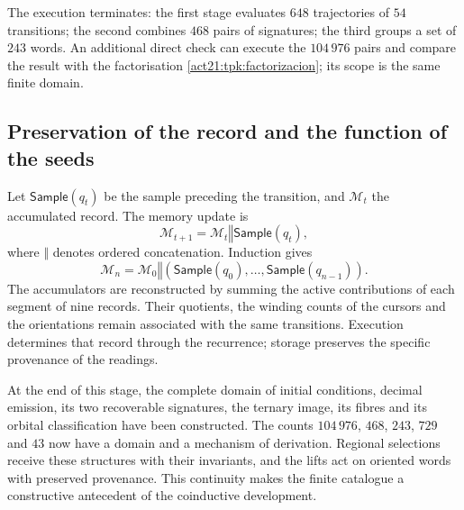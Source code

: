 The execution terminates: the first stage evaluates \(648\) trajectories
of \(54\) transitions; the second combines \(468\) pairs of signatures;
the third groups a set of \(243\) words. An additional direct check can
execute the \(104\,976\) pairs and compare the result with the
factorisation \eqref{act21:tpk:factorizacion}; its scope is the same finite
domain.

\subsection{Preservation of the record and the function of the seeds}
\label{act21:tpk:conclusion}

Let \(\mathsf{Sample}(q_t)\) be the sample preceding the transition, and
\(\mathcal M_t\) the accumulated record. The memory update is
\begin{equation}
 \mathcal M_{t+1}=\mathcal M_t\mathbin{\Vert}\mathsf{Sample}(q_t),
 \label{act21:tpk:archivo}
\end{equation}
where \(\Vert\) denotes ordered concatenation. Induction gives
\[
 \mathcal M_n=\mathcal M_0\mathbin{\Vert}
 (\mathsf{Sample}(q_0),\ldots,\mathsf{Sample}(q_{n-1})).
\]
The accumulators are reconstructed by summing the active contributions
of each segment of nine records. Their quotients, the winding counts
of the cursors and the orientations remain associated with the same
transitions. Execution determines that record through the recurrence;
storage preserves the specific provenance of the readings.

At the end of this stage, the complete domain of initial conditions,
decimal emission, its two recoverable signatures, the ternary image,
its fibres and its orbital classification have been constructed.
The counts \(104\,976\), \(468\), \(243\), \(729\) and \(43\) now
have a domain and a mechanism of derivation. Regional selections receive
these structures with their invariants, and the lifts act on oriented
words with preserved provenance. This continuity makes the finite
catalogue a constructive antecedent of the coinductive development.
